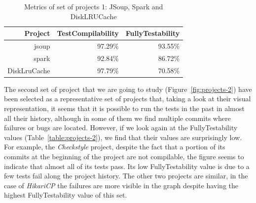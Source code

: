 \begin{figure}[!htb]
\begin{minipage}{.5\textwidth}
        \label{fig:disklrucache}
    \end{minipage}%
\end{figure}

\begin{table}[h!]
    \centering
    \begin{tabular}{|r|r|r|}
    \hline
    \textbf{Project} & \textbf{TestCompilability} & \textbf{FullyTestability} \\ \hline
    jsoup            & 97.29\%                      & 93.55\%                      \\ \hline
    spark            & 92.84\%                      & 86.72\%                      \\ \hline
    DiskLruCache     & 97.79\%                      & 70.58\%                      \\ \hline
    \end{tabular}
    \caption{Metrics of set of projects 1: JSoup, Spark and DiskLRUCache}
    \label{table:projects-1}
\end{table}


The second set of project that we are going to study (Figure~\ref{fig:projects-2}) have been selected as a representative set of projects that, taking a look at their visual representation, it seems that it is possible to run the tests in the past in almost all their history, although in some of them we find multiple commits where failures or bugs are located.
However, if we look again at the FullyTestability values (Table~\ref{table:projects-2}), we find that their values are surprisingly low. 
For example, the \textit{Checkstyle} project, despite the fact that a portion of its commits at the beginning of the project are not compilable, the figure seems to indicate that almost all of its tests pass. 
Its low FullyTestability value is due to a few tests fail along the project history.
The other two projects are similar, in the case of \textit{HikariCP} the failures are more visible in the graph despite having the highest FullyTestability value of this set.

